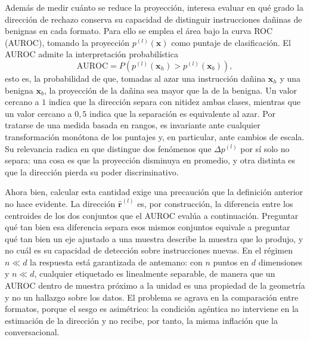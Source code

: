\documentclass[12pt,a4paper]{article}
\begin{document}
Además de medir cuánto se reduce la proyección, interesa evaluar en qué grado la dirección de rechazo conserva su capacidad de distinguir instrucciones dañinas de benignas en cada formato. Para ello se emplea el área bajo la curva ROC (AUROC), tomando la proyección $p^{(l)}(\bm{x})$ como puntaje de clasificación. El AUROC admite la interpretación probabilística
\[
\mathrm{AUROC} = P\!\left( p^{(l)}(\bm{x}_h) > p^{(l)}(\bm{x}_b) \right),
\]
esto es, la probabilidad de que, tomadas al azar una instrucción dañina $\bm{x}_h$ y una benigna $\bm{x}_b$, la proyección de la dañina sea mayor que la de la benigna. Un valor cercano a $1$ indica que la dirección separa con nitidez ambas clases, mientras que un valor cercano a $0{,}5$ indica que la separación es equivalente al azar. Por tratarse de una medida basada en rangos, es invariante ante cualquier transformación monótona de los puntajes y, en particular, ante cambios de escala. Su relevancia radica en que distingue dos fenómenos que $\Delta p^{(l)}$ por sí solo no separa: una cosa es que la proyección disminuya en promedio, y otra distinta es que la dirección pierda su poder discriminativo.

Ahora bien, calcular esta cantidad exige una precaución que la definición anterior no hace evidente. La dirección $\hat{\bm{r}}^{(l)}$ es, por construcción, la diferencia entre los centroides de los dos conjuntos que el AUROC evalúa a continuación. Preguntar qué tan bien esa diferencia separa esos mismos conjuntos equivale a preguntar qué tan bien un eje ajustado a una muestra describe la muestra que lo produjo, y no cuál es su capacidad de detección sobre instrucciones nuevas. En el régimen $n \ll d$ la respuesta está garantizada de antemano: con $n$ puntos en $d$ dimensiones y $n \ll d$, cualquier etiquetado es linealmente separable, de manera que un AUROC dentro de muestra próximo a la unidad es una propiedad de la geometría y no un hallazgo sobre los datos. El problema se agrava en la comparación entre formatos, porque el sesgo es asimétrico: la condición agéntica no interviene en la estimación de la dirección y no recibe, por tanto, la misma inflación que la conversacional.
\end{document}
